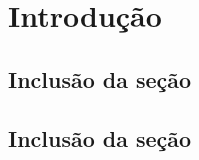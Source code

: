 \chapter{Introdução}
\lipsum

\section{Inclusão da seção}
\lipsum[1-6]

\section{Inclusão da seção}
\lipsum[1-6]
%
%